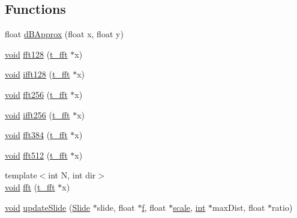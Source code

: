 \subsection*{Functions}
\begin{DoxyCompactItemize}
\item 
float \hyperlink{namespace__sbsms___a647f022e362cf7a49326587d23aca8aa}{d\+B\+Approx} (float x, float y)
\item 
\hyperlink{sound_8c_ae35f5844602719cf66324f4de2a658b3}{void} \hyperlink{namespace__sbsms___aa6ea31b4c826b4574dfea9a4eb1ec265}{fft128} (\hyperlink{namespace__sbsms___af5c6f976b2da21c36853e3b0c5995a54}{t\+\_\+fft} $\ast$x)
\item 
\hyperlink{sound_8c_ae35f5844602719cf66324f4de2a658b3}{void} \hyperlink{namespace__sbsms___ab395b21a80ba2e3d1f5fcd12246822b5}{ifft128} (\hyperlink{namespace__sbsms___af5c6f976b2da21c36853e3b0c5995a54}{t\+\_\+fft} $\ast$x)
\item 
\hyperlink{sound_8c_ae35f5844602719cf66324f4de2a658b3}{void} \hyperlink{namespace__sbsms___aa82e7ecc999460d37f4067f5006cf751}{fft256} (\hyperlink{namespace__sbsms___af5c6f976b2da21c36853e3b0c5995a54}{t\+\_\+fft} $\ast$x)
\item 
\hyperlink{sound_8c_ae35f5844602719cf66324f4de2a658b3}{void} \hyperlink{namespace__sbsms___a72b2381d65e7f263db213e90894e30cf}{ifft256} (\hyperlink{namespace__sbsms___af5c6f976b2da21c36853e3b0c5995a54}{t\+\_\+fft} $\ast$x)
\item 
\hyperlink{sound_8c_ae35f5844602719cf66324f4de2a658b3}{void} \hyperlink{namespace__sbsms___a8d7baf7d22bb83ebbdfdeac0fec7b155}{fft384} (\hyperlink{namespace__sbsms___af5c6f976b2da21c36853e3b0c5995a54}{t\+\_\+fft} $\ast$x)
\item 
\hyperlink{sound_8c_ae35f5844602719cf66324f4de2a658b3}{void} \hyperlink{namespace__sbsms___ac18b1d66c6570f5c7d3347bbc21e2bd3}{fft512} (\hyperlink{namespace__sbsms___af5c6f976b2da21c36853e3b0c5995a54}{t\+\_\+fft} $\ast$x)
\item 
{\footnotesize template$<$int N, int dir$>$ }\\\hyperlink{sound_8c_ae35f5844602719cf66324f4de2a658b3}{void} \hyperlink{namespace__sbsms___ad0ec1c582212ed2a192aeb84247cf4d2}{fft} (\hyperlink{namespace__sbsms___af5c6f976b2da21c36853e3b0c5995a54}{t\+\_\+fft} $\ast$x)
\item 
\hyperlink{sound_8c_ae35f5844602719cf66324f4de2a658b3}{void} \hyperlink{namespace__sbsms___a22c34a8203a2493a4da4755b67bc46b5}{update\+Slide} (\hyperlink{class__sbsms___1_1_slide}{Slide} $\ast$slide, float $\ast$\hyperlink{checksum_8c_ae747d72a1a803f5ff4a4b2602857d93b}{f}, float $\ast$\hyperlink{seqread_8h_a26a42c039941e1d6aa8616c6d7b32541}{scale}, \hyperlink{xmltok_8h_a5a0d4a5641ce434f1d23533f2b2e6653}{int} $\ast$max\+Dist, float $\ast$ratio)

\end{DoxyCompactItemize}
